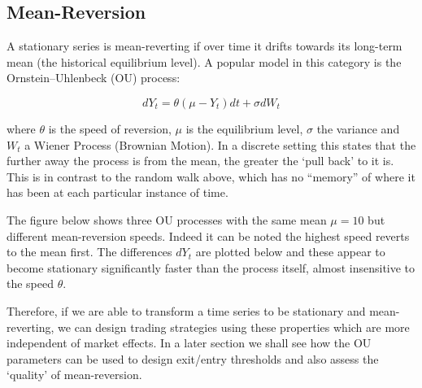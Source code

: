 \documentclass{article}
\begin{document}
    \subsection{Mean-Reversion}\label{mean-reversion}

A stationary series is mean-reverting if over time it drifts towards its
long-term mean (the historical equilibrium level). A popular model in
this category is the Ornstein--Uhlenbeck (OU) process:

\[
dY_t = \theta(\mu - Y_t)dt + \sigma dW_t
\]

where \(\theta\) is the speed of reversion, \(\mu\) is the equilibrium
level, \(\sigma\) the variance and \(W_t\) a Wiener Process (Brownian
Motion). In a discrete setting this states that the further away the
process is from the mean, the greater the `pull back' to it is. This is
in contrast to the random walk above, which has no ``memory'' of where
it has been at each particular instance of time.

The figure below shows three OU processes with the same mean \(\mu=10\)
but different mean-reversion speeds. Indeed it can be noted the highest
speed reverts to the mean first. The differences \(dY_t\) are plotted
below and these appear to become stationary significantly faster than
the process itself, almost insensitive to the speed \(\theta\).

Therefore, if we are able to transform a time series to be stationary
and mean-reverting, we can design trading strategies using these
properties which are more independent of market effects. In a later
section we shall see how the OU parameters can be used to design
exit/entry thresholds and also assess the `quality' of mean-reversion.
\end{document}
